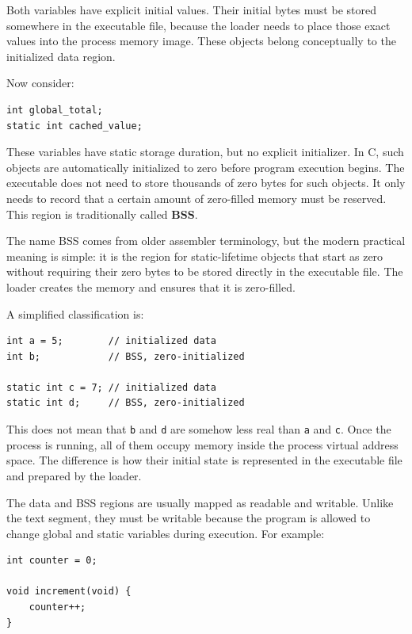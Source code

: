 Both variables have explicit initial values. Their initial bytes must be stored somewhere in the executable file, because the loader needs to place those exact values into the process memory image. These objects belong conceptually to the initialized data region.

Now consider:

\begin{verbatim}
int global_total;
static int cached_value;
\end{verbatim}

These variables have static storage duration, but no explicit initializer. In C, such objects are automatically initialized to zero before program execution begins. The executable does not need to store thousands of zero bytes for such objects. It only needs to record that a certain amount of zero-filled memory must be reserved. This region is traditionally called \textbf{BSS}.

The name BSS comes from older assembler terminology, but the modern practical meaning is simple: it is the region for static-lifetime objects that start as zero without requiring their zero bytes to be stored directly in the executable file. The loader creates the memory and ensures that it is zero-filled.

A simplified classification is:

\begin{verbatim}
int a = 5;        // initialized data
int b;            // BSS, zero-initialized

static int c = 7; // initialized data
static int d;     // BSS, zero-initialized
\end{verbatim}

This does not mean that \texttt{b} and \texttt{d} are somehow less real than \texttt{a} and \texttt{c}. Once the process is running, all of them occupy memory inside the process virtual address space. The difference is how their initial state is represented in the executable file and prepared by the loader.

The data and BSS regions are usually mapped as readable and writable. Unlike the text segment, they must be writable because the program is allowed to change global and static variables during execution. For example:

\begin{verbatim}
int counter = 0;

void increment(void) {
    counter++;
}
\end{verbatim}

